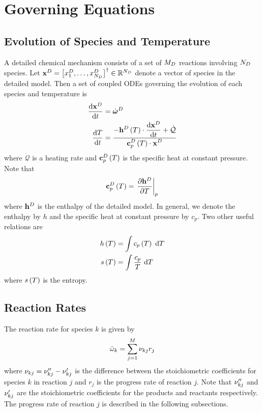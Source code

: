 \section{Governing Equations}

\subsection{Evolution of Species and Temperature}
A detailed chemical mechanism consists of a set of $M_{D}$ reactions involving $N_{D}$ species.  
Let $\mathbf{x}^{D} = \left[x_{1}^{D}, \ldots, x_{N_{D}}^{D}\right]^{\dagger} \in \mathbb{R}^{N_{D}}$ denote 
a vector of species in the detailed model.  Then a set of coupled ODEs governing the evolution 
of each species and temperature is
\begin{align}
  \frac{\mathrm{d} \mathbf{x}^{D}}{\mathrm{d} t} &= \dot{\boldsymbol{\omega}}^{D} \\
  \frac{\mathrm{d} T}{\mathrm{d} t}   &= \frac{\displaystyle -\mathbf{h}^{D}\left(T\right)\cdot\frac{\mathrm{d} \mathbf{x}^{D}}{\mathrm{d} t} + \dot{\mathcal{Q}}}{\displaystyle \mathbf{c}_{p}^{D}\left(T\right)\cdot\mathbf{x}^{D}}
\end{align}
where $\dot{\mathcal{Q}}$ is a heating rate and $\mathbf{c}_{p}^{D}\left(T\right)$ is the specific heat at constant 
pressure.  Note that
\begin{align}
  \mathbf{c}_{p}^{D}\left(T\right) = \left.\frac{\partial \mathbf{h}^{D}}{\partial T}\right|_{p}
\end{align}
where $\mathbf{h}^{D}$ is the enthalpy of the detailed model.  In general, we denote the enthalpy by $h$ 
and the specific heat at constant pressure by $c_{p}$.
Two other useful relations are
\begin{align}
  h\left(T\right) &= \int{c_{p}\left(T\right) \ \mathrm{d}T} \label{eq:h_cp_rel} \\
  s\left(T\right) &= \int{\frac{c_{p}}{T} \ \mathrm{d}T} \label{eq:s_cp_rel}
\end{align}
where $s\left(T\right)$ is the entropy.

\subsection{Reaction Rates}
The reaction rate for species $k$ is given by 
\begin{align}
  \dot{\omega}_{k} = \sum_{j=1}^{M}{\nu_{kj}r_{j}}
\end{align}
 where $\nu_{kj} = \nu_{kj}^{\prime\prime} - \nu_{kj}^{\prime}$ is the difference between
 the stoichiometric coefficients for species $k$ 
in reaction $j$ and $r_{j}$ is the progress rate of reaction $j$.  
Note that $\nu_{kj}^{\prime\prime}$ and $\nu_{kj}^{\prime}$ are the stoichiometric 
coefficients for the products and reactants respectively. The 
progress rate of reaction $j$ is described in the following 
subsections.
